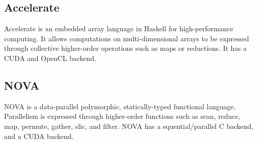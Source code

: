 \subsection*{Accelerate}
Accelerate\cite{accelerate} is an embedded array language in Haskell for 
high-performance
computing. It allows computations on multi-dimensional arrays to be expressed
through collective higher-order operations such as maps or reductions. It has
a CUDA and OpenCL backend.

\subsection*{NOVA}
NOVA\cite{collins2013nova} is a data-parallel polymorphic, statically-typed
functional language. Parallelism is expressed through higher-order functions
such as scan, reduce, map, permute, gather, slic, and filter. NOVA has a
squential/parallel C backend, and a CUDA backend.
